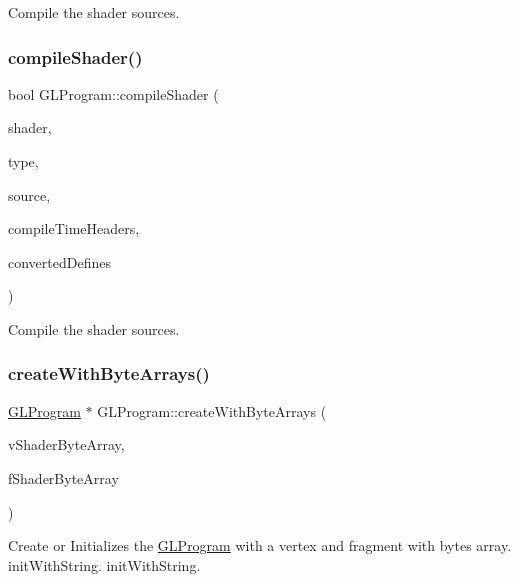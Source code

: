 Compile the shader sources. \mbox{\label{classGLProgram_acd1fcd39d2b900d77500665cf1c6e4bb}} 
\subsubsection{\texorpdfstring{compile\+Shader()}{compileShader()}\hspace{0.1cm}{\footnotesize\ttfamily [2/2]}}
{\footnotesize\ttfamily bool G\+L\+Program\+::compile\+Shader (\begin{DoxyParamCaption}\item[{G\+Luint $\ast$}]{shader,  }\item[{G\+Lenum}]{type,  }\item[{const G\+Lchar $\ast$}]{source,  }\item[{const std\+::string \&}]{compile\+Time\+Headers,  }\item[{const std\+::string \&}]{converted\+Defines }\end{DoxyParamCaption})\hspace{0.3cm}{\ttfamily [protected]}}

Compile the shader sources. \mbox{\label{classGLProgram_ab0ef9116f8efe7aa0d6d1a689dbfb262}} 
\subsubsection{\texorpdfstring{create\+With\+Byte\+Arrays()}{createWithByteArrays()}\hspace{0.1cm}{\footnotesize\ttfamily [1/3]}}
{\footnotesize\ttfamily \hyperlink{classGLProgram}{G\+L\+Program} $\ast$ G\+L\+Program\+::create\+With\+Byte\+Arrays (\begin{DoxyParamCaption}\item[{const G\+Lchar $\ast$}]{v\+Shader\+Byte\+Array,  }\item[{const G\+Lchar $\ast$}]{f\+Shader\+Byte\+Array }\end{DoxyParamCaption})\hspace{0.3cm}{\ttfamily [static]}}

Create or Initializes the \hyperlink{classGLProgram}{G\+L\+Program} with a vertex and fragment with bytes array.  init\+With\+String.  init\+With\+String. \mbox{\label{classGLProgram_afa4e0cd4555d39d4f8e31d866a2db1f7}} 
